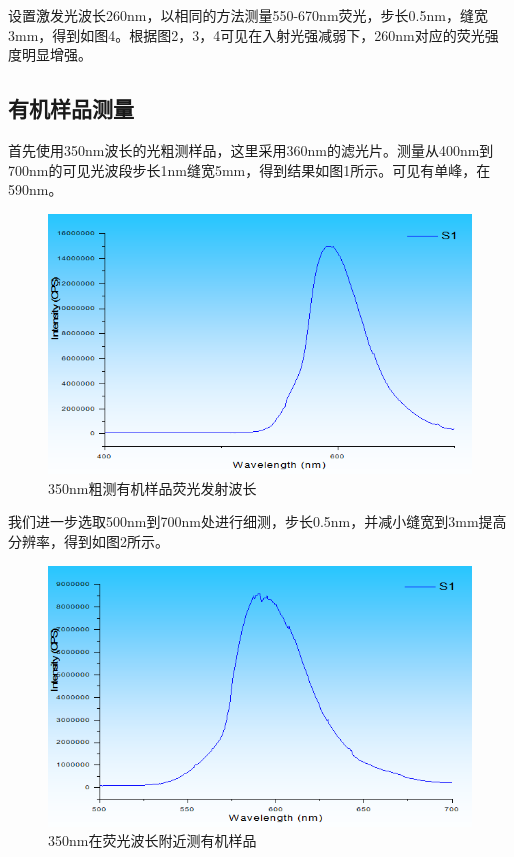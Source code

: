 \documentclass{article}
\begin{document}
设置激发光波长260nm，以相同的方法测量550-670nm荧光，步长0.5nm，缝宽3mm，得到如图4。根据图2，3，4可见在入射光强减弱下，260nm对应的荧光强度明显增强。


	
	\subsection{有机样品测量}

首先使用350nm波长的光粗测样品，这里采用360nm的滤光片。测量从400nm到700nm的可见光波段步长1nm缝宽5mm，得到结果如图1所示。可见有单峰，在590nm。
		\begin{figure}[!h]
		\centering
		\includegraphics[scale=0.8]{4}
		\caption{\heiti{}350nm粗测有机样品荧光发射波长}
		
	\end{figure}
	
	
	我们进一步选取500nm到700nm处进行细测，步长0.5nm，并减小缝宽到3mm提高分辨率，得到如图2所示。
	\begin{figure}[!h]
		\centering
		\includegraphics[scale=0.8]{5}
		\caption{\heiti{}350nm在荧光波长附近测有机样品}
		
	\end{figure}
	
\end{document}

